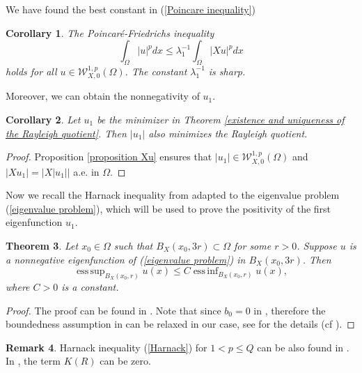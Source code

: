 \documentclass[a4paper,12pt,reqno]{amsart}
\renewcommand\eqref[1]{(\ref{#1})} %
\numberwithin{equation}{section}
\theoremstyle{plain}
\newtheorem{theorem}{Theorem}[section]
\newtheorem{corollary}[theorem]{Corollary}
\theoremstyle{definition}
\newtheorem{remark}[theorem]{Remark}
\DeclareMathOperator*{\esssup}{ess\,sup}
\DeclareMathOperator*{\essinf}{ess\,inf}
\begin{document}
We have found the best constant in \eqref{Poincare inequality}
\begin{corollary}\label{the best constant of Poincare}
The Poincar\'e-Friedrichs inequality 
\begin{equation*}
\int_{\Omega}|u|^{p} d x\leq \lambda_{1}^{-1} \int_{\Omega}|X u|^{p} d x 
\end{equation*}
holds for all $u\in \mathcal{W}_{X,0}^{1, p}(\Omega)$. The constant $\lambda_{1}^{-1}$ is sharp.
\end{corollary}

Moreover, we can obtain the nonnegativity of $u_{1}$.
\begin{corollary}\label{|u_1| minimizes}
Let $u_{1}$ be the minimizer in Theorem \ref{existence and uniqueness of the Rayleigh quotient}. Then $|u_{1}|$ also minimizes the Rayleigh quotient.
\end{corollary}
\begin{proof}
Proposition \ref{proposition Xu} ensures that $|u_{1}| \in \mathcal{W}_{X,0}^{1, p}(\Omega)$ and  $|Xu_{1}|=|X|u_{1}||$  a.e. in $\Omega$.
\end{proof}
Now we recall the Harnack inequality from \cite{Lu1996} adapted to the eigenvalue problem \eqref{eigenvalue problem}, which will be used to prove the positivity of the first eigenfunction $u_{1}$.
\begin{theorem}\label{Harnack inequality}
Let $x_{0}\in\Omega$ such that $B_{X}(x_0, 3r)\subset \Omega$ for some $r>0$. Suppose $u$ is a nonnegative eigenfunction of \eqref{eigenvalue problem} in  $B_{X}(x_0, 3r)$. Then
\begin{equation}\label{Harnack}
\esssup _{B_{X}(x_0, r)} u(x) \leq C \essinf _{B_{X}(x_0, r)} u(x),
\end{equation}
where $C>0$ is a constant.
\end{theorem}
\begin{proof}
The proof can be found in \cite[Corollary 3.11]{Lu1996}. Note that since $b_0=0$ in \cite[(3.1) formula, p. 314]{Lu1996}, therefore the boundedness assumption in \cite[Corollary 3.11]{Lu1996} can be relaxed in our case, see \cite[p. 318]{Lu1996} for the details (cf \cite[p. 724]{Trudinger1967}).
\end{proof}
\begin{remark}
Harnack inequality \eqref{Harnack} for $1<p\leq Q$ can be also found in \cite[Theorem 3.1]{capogna1993embedding}. In \cite[Theorem 3.1]{capogna1993embedding}, the term $K(R)$ can be zero.
\end{remark}
\end{document}
